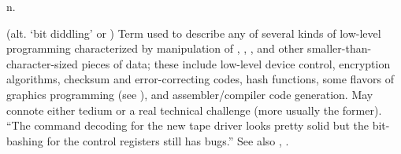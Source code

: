  n.

(alt. `bit diddling' or ) Term used to describe any of
several kinds of low-level programming characterized by manipulation of
, , , and other
smaller-than-character-sized pieces of data; these include low-level device
control, encryption algorithms, checksum and error-correcting codes, hash
functions, some flavors of graphics programming (see ), and
assembler/compiler code generation. May connote either tedium or a real
technical challenge (more usually the former). ``The command decoding for the
new tape driver looks pretty solid but the bit-bashing for the control registers
still has bugs.'' See also , .

